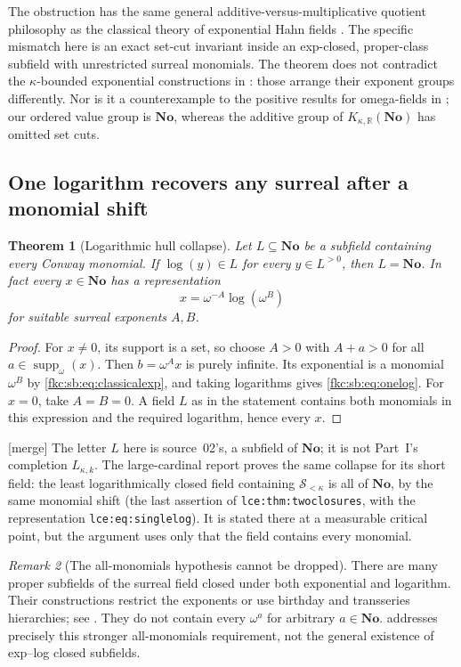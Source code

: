 \documentclass[11pt,letterpaper]{article}
\numberwithin{equation}{section}
\newtheorem{theorem}{Theorem}[section]
\theoremstyle{definition}
\theoremstyle{remark}
\newtheorem{remark}[theorem]{Remark}
\newcommand{\R}{\mathbb R}
\newcommand{\No}{\mathbf{No}}
\newcommand{\mergetag}{\textup{\textsf{\small[merge]}}}%
\newcommand{\suppw}{\operatorname{supp}_{\omega}}
\newcommand{\KN}[2]{K_{#1,#2}(\No)}%
\newcommand{\lbl}[1]{\nolinkurl{#1}}%
\begin{document}
The obstruction has the same general additive-versus-multiplicative quotient philosophy as the classical theory of exponential Hahn fields \cite{KKS,KS}. The specific mismatch here is an exact set-cut invariant inside an exp-closed, proper-class subfield with unrestricted surreal monomials. The theorem does not contradict the $\kappa$-bounded exponential constructions in \cite{KS}: those arrange their exponent groups differently. Nor is it a counterexample to the positive results for omega-fields in \cite{BKMM}; our ordered value group is $\No$, whereas the additive group of $\KN\kappa\R$ has omitted set cuts.

\subsection{One logarithm recovers any surreal after a monomial shift}
\begin{theorem}[Logarithmic hull collapse]\label{fkc:sb:thm:loghull}
Let $L\subseteq\No$ be a subfield containing every Conway monomial. If $\log(y)\in L$ for every $y\in L^{>0}$, then $L=\No$. In fact every $x\in\No$ has a representation
\begin{equation}\label{fkc:sb:eq:onelog}
 x=\omega^{-A}\log(\omega^B)
\end{equation}
for suitable surreal exponents $A,B$.
\end{theorem}
\begin{proof}
For $x\ne0$, its support is a set, so choose $A>0$ with $A+a>0$ for all $a\in\suppw(x)$. Then $b=\omega^A x$ is purely infinite. Its exponential is a monomial $\omega^B$ by \eqref{fkc:sb:eq:classicalexp}, and taking logarithms gives \eqref{fkc:sb:eq:onelog}. For $x=0$, take $A=B=0$. A field $L$ as in the statement contains both monomials in this expression and the required logarithm, hence every $x$.
\end{proof}
\mergetag{} The letter $L$ here is source~02's, a subfield of $\No$; it is not Part~I's completion $L_{\kappa,k}$. The large-cardinal report proves the same collapse for its short field: the least logarithmically closed field containing $\mathscr S_{<\kappa}$ is all of $\No$, by the same monomial shift (the last assertion of \lbl{lce:thm:twoclosures}, with the representation \lbl{lce:eq:singlelog}). It is stated there at a measurable critical point, but the argument uses only that the field contains every monomial.

\begin{remark}[The all-monomials hypothesis cannot be dropped]\label{fkc:sb:rem:allmonomials}
There are many proper subfields of the surreal field closed under both exponential and logarithm. Their constructions restrict the exponents or use birthday and transseries hierarchies; see \cite{BG}. They do not contain every $\omega^a$ for arbitrary $a\in\No$.  addresses precisely this stronger all-monomials requirement, not the general existence of exp--log closed subfields.
\end{remark}
\end{document}
